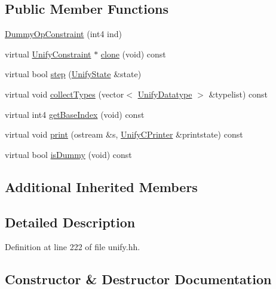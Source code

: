 \subsection*{Public Member Functions}
\begin{DoxyCompactItemize}
\item 
\mbox{\hyperlink{class_dummy_op_constraint_aa3f4a19e008330c55c31c2e3b109e439}{Dummy\+Op\+Constraint}} (int4 ind)
\item 
virtual \mbox{\hyperlink{class_unify_constraint}{Unify\+Constraint}} $\ast$ \mbox{\hyperlink{class_dummy_op_constraint_a86d183fe63aec86dc883c626287f32ed}{clone}} (void) const
\item 
virtual bool \mbox{\hyperlink{class_dummy_op_constraint_a4f2cc27e6d3181b10bf078fb434102a9}{step}} (\mbox{\hyperlink{class_unify_state}{Unify\+State}} \&state)
\item 
virtual void \mbox{\hyperlink{class_dummy_op_constraint_a577187689bb53d42fff84328d474c5db}{collect\+Types}} (vector$<$ \mbox{\hyperlink{class_unify_datatype}{Unify\+Datatype}} $>$ \&typelist) const
\item 
virtual int4 \mbox{\hyperlink{class_dummy_op_constraint_aed05c6e3babcb9306d10e8a5379b146b}{get\+Base\+Index}} (void) const
\item 
virtual void \mbox{\hyperlink{class_dummy_op_constraint_a39e037049025cf469bd939cc26b4e66c}{print}} (ostream \&s, \mbox{\hyperlink{class_unify_c_printer}{Unify\+C\+Printer}} \&printstate) const
\item 
virtual bool \mbox{\hyperlink{class_dummy_op_constraint_a2153d437eb36b8f726b63d25dc7c3a09}{is\+Dummy}} (void) const
\end{DoxyCompactItemize}
\subsection*{Additional Inherited Members}


\subsection{Detailed Description}


Definition at line 222 of file unify.\+hh.



\subsection{Constructor \& Destructor Documentation}
\mbox{\label{class_dummy_op_constraint_aa3f4a19e008330c55c31c2e3b109e439}} 
